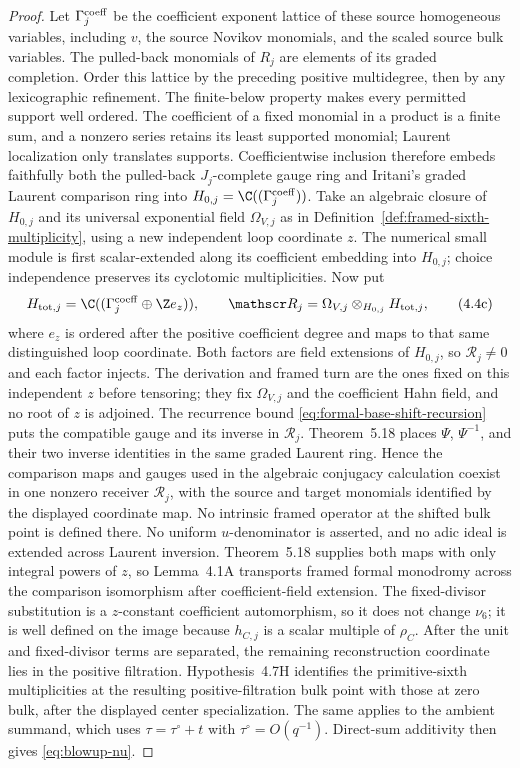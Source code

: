 \begin{proof}
Let \(\Gamma_j^{\rm coeff}\) be the coefficient exponent lattice of these
source homogeneous variables, including \(v\), the source Novikov monomials,
and the scaled source bulk variables.  The pulled-back monomials of \(R_j\)
are elements of its graded completion.  Order this lattice by the preceding
positive multidegree, then by any lexicographic refinement.  The finite-below
property makes every permitted support well ordered.  The coefficient of a
fixed monomial in a product is a finite sum, and a nonzero series retains its
least supported monomial; Laurent localization only translates supports.
Coefficientwise inclusion therefore embeds faithfully both the pulled-back
\(J_j\)-complete gauge ring and Iritani's graded Laurent comparison ring into
\(H_{0,j}=\C((\Gamma_j^{\rm coeff}))\).  Take an algebraic closure of
\(H_{0,j}\) and its universal exponential field \(\Omega_{V,j}\) as in
Definition~\ref{def:framed-sixth-multiplicity}, using a new independent loop
coordinate \(z\).  The numerical small module is first scalar-extended along
its coefficient embedding into \(H_{0,j}\); choice independence preserves
its cyclotomic multiplicities.  Now put
\[
 H_{{\rm tot},j}=\C((\Gamma_j^{\rm coeff}\oplus\Z e_z)),
 \qquad
 \mathscr R_j=\Omega_{V,j}\otimes_{H_{0,j}}H_{{\rm tot},j},
 \tag{4.4c}
 \label{eq:blowup-hahn-receiver}
\]
where \(e_z\) is ordered after the positive coefficient degree and maps to
that same distinguished loop coordinate.  Both factors are field extensions
of \(H_{0,j}\), so \(\mathscr R_j\ne0\) and each factor injects.  The
derivation and framed turn are the ones fixed on this independent \(z\)
before tensoring; they fix \(\Omega_{V,j}\) and the coefficient Hahn field,
and no root of \(z\) is adjoined.  The recurrence bound
\eqref{eq:formal-base-shift-recursion} puts the compatible gauge and its
inverse in \(\mathscr R_j\).  Theorem~5.18 places \(\Psi\),
\(\Psi^{-1}\), and their two inverse identities in the same graded Laurent
ring.  Hence the comparison maps and gauges used in the algebraic conjugacy
calculation coexist in one nonzero receiver \(\mathscr R_j\), with the source
and target monomials identified by the displayed coordinate map.  No intrinsic
framed operator at the shifted bulk point is defined there.  No uniform
\(u\)-denominator is asserted, and no adic ideal is extended across Laurent
inversion.  Theorem~5.18 supplies both maps with only integral powers of
\(z\), so Lemma~4.1A transports framed formal monodromy across the comparison
isomorphism after coefficient-field extension.  The fixed-divisor
substitution is a \(z\)-constant
coefficient automorphism, so it does not change \(\nu_6\); it is well defined
on the image because \(h_{C,j}\) is a scalar multiple of \(\rho_C\).
After the unit and fixed-divisor terms are separated, the remaining
reconstruction coordinate lies in the positive filtration.  Hypothesis~4.7H
identifies the primitive-sixth multiplicities at the resulting
positive-filtration bulk point with those at zero bulk, after the displayed
center specialization.  The same applies to the ambient summand, which uses
\(\tau=\tau^\circ+t\) with \(\tau^\circ=O(q^{-1})\).  Direct-sum additivity
then gives \eqref{eq:blowup-nu}.


\end{proof}
